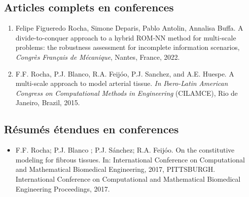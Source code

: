 \documentclass[french]{article}
\begin{document}
\subsection*{Articles complets en conferences} 
\begin{enumerate}
	\item Felipe Figueredo Rocha, Simone Deparis, Pablo Antolin, Annalisa Buffa. 
	A divide-to-conquer approach to a hybrid ROM-NN
	method for multi-scale problems: the robustness
	assessment for incomplete information scenarios, \textit{Congrès Français de Mécanique}, Nantes, France, 2022.
	\item F.F. Rocha, P.J. Blanco, R.A. Feijóo, P.J. Sanchez, and A.E. Huespe. A multi-scale approach to model arterial tissue. \textit{In Ibero-Latin American Congress on Computational Methods in Engineering} (CILAMCE), Rio
	de Janeiro, Brazil, 2015.
\end{enumerate}	
\subsection*{Résumés étendues en conferences}
\begin{itemize}
	\item F.F. Rocha; P.J. Blanco ; P.J. Sánchez; R.A. Feijóo. On the constitutive modeling for fibrous tissues. In: International Conference on Computational and Mathematical Biomedical Engineering, 2017, PITTSBURGH. International Conference on Computational and Mathematical Biomedical Engineering Proceedings, 2017.
\end{itemize}
\end{document}
